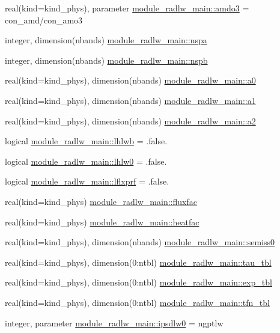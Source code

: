 \begin{DoxyCompactItemize}
\item 
real(kind=kind\+\_\+phys), parameter \hyperlink{namespacemodule__radlw__main_a06f62c34722a3d7dcec9b5643d78f039}{module\+\_\+radlw\+\_\+main\+::amdo3} = con\+\_\+amd/con\+\_\+amo3
\item 
integer, dimension(nbands) \hyperlink{namespacemodule__radlw__main_a42bbf62b5d91586f17d352af74e3c032}{module\+\_\+radlw\+\_\+main\+::nspa}
\item 
integer, dimension(nbands) \hyperlink{namespacemodule__radlw__main_a520be8a7f308d9e2c8e88b185170404e}{module\+\_\+radlw\+\_\+main\+::nspb}
\item 
real(kind=kind\+\_\+phys), dimension(nbands) \hyperlink{namespacemodule__radlw__main_ae55000724e738b7a5b7be4c8cef07553}{module\+\_\+radlw\+\_\+main\+::a0}
\item 
real(kind=kind\+\_\+phys), dimension(nbands) \hyperlink{namespacemodule__radlw__main_aeba888f00b19a65460f3b587c60ea4a0}{module\+\_\+radlw\+\_\+main\+::a1}
\item 
real(kind=kind\+\_\+phys), dimension(nbands) \hyperlink{namespacemodule__radlw__main_a1b4681c9bcc9434e30fef0ca4aaa9dcd}{module\+\_\+radlw\+\_\+main\+::a2}
\item 
logical \hyperlink{namespacemodule__radlw__main_a40b8a6f612a53e0a768cf922aa6f73c3}{module\+\_\+radlw\+\_\+main\+::lhlwb} = .false.
\item 
logical \hyperlink{namespacemodule__radlw__main_a7f8818436b81efe586d83b2f03b1617f}{module\+\_\+radlw\+\_\+main\+::lhlw0} = .false.
\item 
logical \hyperlink{namespacemodule__radlw__main_aec461dc1a50b326daa15c57c7dc55602}{module\+\_\+radlw\+\_\+main\+::lflxprf} = .false.
\item 
real(kind=kind\+\_\+phys) \hyperlink{namespacemodule__radlw__main_a3c31da677e01139d9a3f1e0795a0b614}{module\+\_\+radlw\+\_\+main\+::fluxfac}
\item 
real(kind=kind\+\_\+phys) \hyperlink{namespacemodule__radlw__main_a75ff8e29e21f0d07684d4a09c744daec}{module\+\_\+radlw\+\_\+main\+::heatfac}
\item 
real(kind=kind\+\_\+phys), dimension(nbands) \hyperlink{namespacemodule__radlw__main_ae3b32aa685e5f07a0003c5e919d22996}{module\+\_\+radlw\+\_\+main\+::semiss0}
\item 
real(kind=kind\+\_\+phys), dimension(0\+:ntbl) \hyperlink{namespacemodule__radlw__main_a9f73814ee0b1840d8c546ef341645f43}{module\+\_\+radlw\+\_\+main\+::tau\+\_\+tbl}
\item 
real(kind=kind\+\_\+phys), dimension(0\+:ntbl) \hyperlink{namespacemodule__radlw__main_ac2f240a927351a68fc9063321a307891}{module\+\_\+radlw\+\_\+main\+::exp\+\_\+tbl}
\item 
real(kind=kind\+\_\+phys), dimension(0\+:ntbl) \hyperlink{namespacemodule__radlw__main_a71dcfb3c365280e100e180fd1ce939ad}{module\+\_\+radlw\+\_\+main\+::tfn\+\_\+tbl}
\item 
integer, parameter \hyperlink{namespacemodule__radlw__main_a9b634a4f7b06ffdd919de69a165edadc}{module\+\_\+radlw\+\_\+main\+::ipsdlw0} = ngptlw
\end{DoxyCompactItemize}


